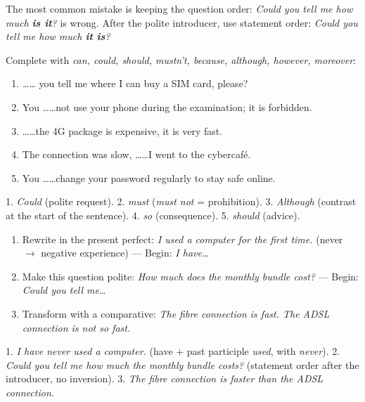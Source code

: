 \documentclass[11pt]{article}
\newcounter{popsec}
\newcounter{popsub}
\newcommand{\courssub}[1]{%
  \stepcounter{popsub}%
  \par\vspace{9pt}\noindent{\popxbold\fontsize{11.5}{13}\selectfont\color{popink}{\color{poporange}\thepopsec.\thepopsub}\hspace{6pt}#1}\par\nopagebreak\vspace{4pt}
}
\begin{document}
\begin{attention}
The most common mistake is keeping the question order: \emph{Could you tell me how much \textbf{is it}?} is wrong. After the polite introducer, use statement order: \emph{Could you tell me how much \textbf{it is}?}
\end{attention}

\courssub{Consolidation exercises}

\begin{exercice}
Complete with \emph{can, could, should, mustn't, because, although, however, moreover}:
\begin{enumerate}
\item \emph{\ldots\ldots} you tell me where I can buy a SIM card, please?
\item You \ldots\ldots not use your phone during the examination; it is forbidden.
\item \ldots\ldots the 4G package is expensive, it is very fast.
\item The connection was slow, \ldots\ldots I went to the cybercafé.
\item You \ldots\ldots change your password regularly to stay safe online.
\end{enumerate}
\end{exercice}

\begin{corrige}[Exercice 1]
1. \emph{Could} (polite request). 2. \emph{must} (\emph{must not} = prohibition). 3. \emph{Although} (contrast at the start of the sentence). 4. \emph{so} (consequence). 5. \emph{should} (advice).
\end{corrige}

\begin{exercice}
\begin{enumerate}
\item Rewrite in the present perfect: \emph{I used a computer for the first time.} (never $\rightarrow$ negative experience) — Begin: \emph{I have\ldots}
\item Make this question polite: \emph{How much does the monthly bundle cost?} — Begin: \emph{Could you tell me\ldots}
\item Transform with a comparative: \emph{The fibre connection is fast. The ADSL connection is not so fast.}
\end{enumerate}
\end{exercice}

\begin{corrige}[Exercice 2]
1. \emph{I have never used a computer.} (have + past participle \emph{used}, with \emph{never}). 2. \emph{Could you tell me how much the monthly bundle costs?} (statement order after the introducer, no inversion). 3. \emph{The fibre connection is faster than the ADSL connection.}
\end{corrige}
\end{document}
